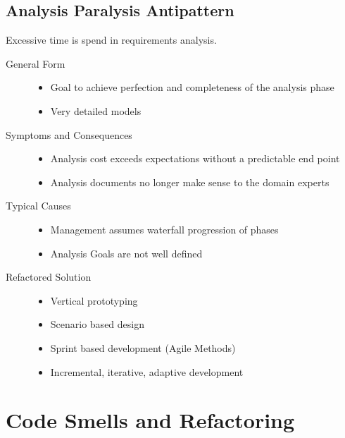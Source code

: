 \subsection{Analysis Paralysis Antipattern}
Excessive time is spend in requirements analysis.
\begin{description}
  \item[General Form] \hfill
  \begin{itemize}
    \item Goal to achieve perfection and completeness of the analysis phase
    \item Very detailed models
  \end{itemize}
  \item[Symptoms and Consequences] \hfill
  \begin{itemize}
    \item Analysis cost exceeds expectations without a predictable end point
    \item Analysis documents no longer make sense to the domain experts
  \end{itemize}
  \item[Typical Causes] \hfill
  \begin{itemize}
    \item Management assumes waterfall progression of phases
    \item Analysis Goals are not well defined
  \end{itemize}
  \item[Refactored Solution]
  \begin{itemize}
  	\item Vertical prototyping
  	\item Scenario based design
  	\item Sprint based development (Agile Methods)
  	\item Incremental, iterative, adaptive development
  \end{itemize}
\end{description}
\newpage

\section{Code Smells and Refactoring}
